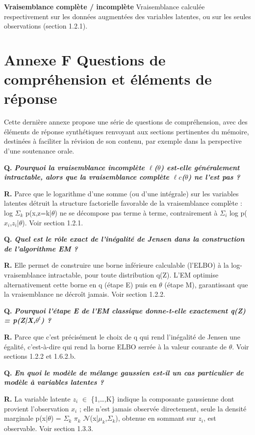 \textbf{Vraisemblance complète / incomplète  }Vraisemblance calculée respectivement sur les données augmentées des variables latentes, ou sur les seules observations (section 1.2.1).

\section*{Annexe F  Questions de compréhension et éléments de réponse}
Cette dernière annexe propose une série de questions de compréhension, avec des éléments de réponse synthétiques renvoyant aux sections pertinentes du mémoire, destinées à faciliter la révision de son contenu, par exemple dans la perspective d'une soutenance orale.

\textbf{Q. }\textbf{\emph{Pourquoi la vraisemblance incomplète $\ell $($\theta $) est-elle généralement intractable, alors que la vraisemblance complète $\ell c$($\theta $) ne l'est pas ?}}

\textbf{R. }Parce que le logarithme d'une somme (ou d'une intégrale) sur les variables latentes détruit la structure factorielle favorable de la vraisemblance complète : log $\Sigma _{k}$ p(x,z=k|$\theta $) ne se décompose pas terme à terme, contrairement à $\Sigma _{i}$ log p($x_{i}$,$z_{i}$|$\theta $). Voir section 1.2.1.

\textbf{Q. }\textbf{\emph{Quel est le rôle exact de l'inégalité de Jensen dans la construction de l'algorithme EM ?}}

\textbf{R. }Elle permet de construire une borne inférieure calculable (l'ELBO) à la log-vraisemblance intractable, pour toute distribution q(Z). L'EM optimise alternativement cette borne en q (étape E) puis en $\theta $ (étape M), garantissant que la vraisemblance ne décroît jamais. Voir section 1.2.2.

\textbf{Q. }\textbf{\emph{Pourquoi l'étape E de l'EM classique donne-t-elle exactement q(Z) = p(Z|X,$\theta ^{t}$) ?}}

\textbf{R. }Parce que c'est précisément le choix de q qui rend l'inégalité de Jensen une égalité, c'est-à-dire qui rend la borne ELBO serrée à la valeur courante de $\theta $. Voir sections 1.2.2 et 1.6.2.b.

\textbf{Q. }\textbf{\emph{En quoi le modèle de mélange gaussien est-il un cas particulier de modèle à variables latentes ?}}

\textbf{R. }La variable latente $z_{i}$ $\in $ \{1,\ldots{},K\} indique la composante gaussienne dont provient l'observation $x_{i}$ ; elle n'est jamais observée directement, seule la densité marginale p(x|$\theta $) = $\Sigma _{k}$ $\pi _{k}$ $\mathcal{N}$(x|$\mu _{k}$,$\Sigma _{k}$), obtenue en sommant sur $z_{i}$, est observable. Voir section 1.3.3.

